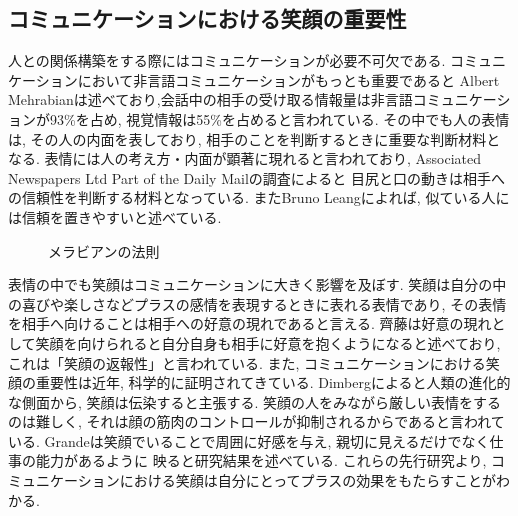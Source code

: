 \subsection{コミュニケーションにおける笑顔の重要性}
人との関係構築をする際にはコミュニケーションが必要不可欠である.
コミュニケーションにおいて非言語コミュニケーションがもっとも重要であると
Albert Mehrabianは述べており,会話中の相手の受け取る情報量は非言語コミュニケーションが93\%を占め,
視覚情報は55\%を占めると言われている\cite{rule_of_Mehrabian}.
その中でも人の表情は, その人の内面を表しており, 相手のことを判断するときに重要な判断材料となる.
表情には人の考え方・内面が顕著に現れると言われており,
Associated Newspapers Ltd Part of the Daily Mailの調査によると
目尻と口の動きは相手への信頼性を判断する材料となっている\cite{TheMailonSunday}.
またBruno Leangによれば, 似ている人には信頼を置きやすいと述べている\cite{Bruno}.

\begin{figure}[htbp]
    \begin{center}
    \end{center}
    \caption{メラビアンの法則}
    \label{fig:mehrabian}
\end{figure}

表情の中でも笑顔はコミュニケーションに大きく影響を及ぼす.
笑顔は自分の中の喜びや楽しさなどプラスの感情を表現するときに表れる表情であり,
その表情を相手へ向けることは相手への好意の現れであると言える.
齊藤は好意の現れとして笑顔を向けられると自分自身も相手に好意を抱くようになると述べており,
これは「笑顔の返報性」と言われている\cite{齊藤勇2005恋愛心理学}.
また, コミュニケーションにおける笑顔の重要性は近年, 科学的に証明されてきている.
Dimbergによると人類の進化的な側面から, 笑顔は伝染すると主張する.
笑顔の人をみながら厳しい表情をするのは難しく,
それは顔の筋肉のコントロールが抑制されるからであると言われている\cite{dimberg2011voluntary}.
Grandeは笑顔でいることで周囲に好感を与え, 親切に見えるだけでなく仕事の能力があるように
映ると研究結果を述べている\cite{grandey2005service}.
これらの先行研究より, コミュニケーションにおける笑顔は自分にとってプラスの効果をもたらすことがわかる.

